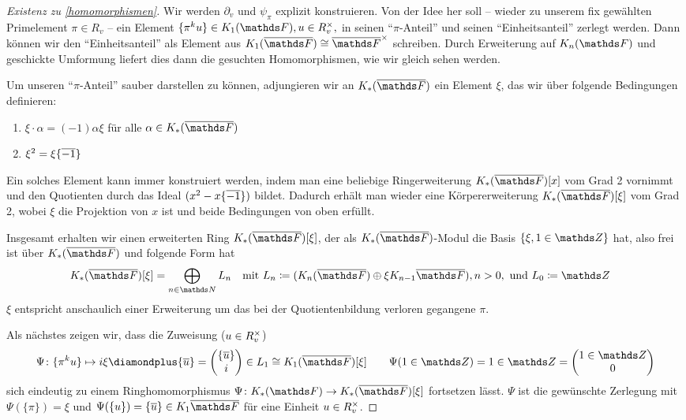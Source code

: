 \documentclass[ngerman,fontsize=11pt, paper=a4, parskip=half, titlepage=true, toc=bib]{scrartcl}
\begin{document}
\begin{proof}[Existenz zu \ref{homomorphismen}]
  Wir werden $\partial_v$ und $\psi_\pi$ explizit konstruieren.
  Von der Idee her soll 
  – wieder zu unserem fix gewählten Primelement $\pi\in R_v$ – 
  ein Element $\{\pi^ku\}\in\KoF, u\in \Rx_v,$
  in seinen \enquote{$\pi$-Anteil} und seinen 
  \enquote{Einheitsanteil} zerlegt werden. 
  Dann können wir den \enquote{Einheitsanteil} als Element aus 
  $\K_1(\bF)\cong \bFx$ schreiben. Durch Erweiterung auf $\KnF$ und 
  geschickte Umformung liefert dies dann die
  gesuchten Homomorphismen, wie wir gleich sehen werden.
  
  Um unseren \enquote{$\pi$-Anteil} sauber darstellen zu können,
  adjungieren wir an $\KbF$ ein Element $\xi$, das wir über
  folgende Bedingungen definieren:
  \begin{enumerate}[(1)]
  \item $\xi\cdot \alpha=(-1)\alpha\xi$ für alle $\alpha\in\KbF$
  \item $\xi^2=\xi\{\overline{-1}\}$
  \end{enumerate}
  Ein solches Element kann immer konstruiert werden, indem man eine
  beliebige Ringerweiterung $\KbF[x]$ vom Grad 2 vornimmt und den
  Quotienten durch das Ideal $(x^2-x\{\overline{-1}\})$ bildet. Dadurch
  erhält man wieder eine Körpererweiterung $\KbF[\xi]$ vom Grad 2,
  wobei $\xi$ die Projektion von $x$ ist und beide Bedingungen von
  oben erfüllt.
  
  Insgesamt erhalten wir einen erweiterten Ring $\KbF[\xi]$, der als
  $\KbF$-Modul die Basis $\{ \xi, 1\in\Z\}$ hat, also frei ist über
  $\KbF$ und folgende Form hat
  \begin{align*}
    \KbF[\xi]&=\bigoplus_{n\in\N}L_n
    &&\text{mit } 
       L_n\coloneqq (\KnbF\oplus\xi\K_{n-1}\bF), n>0,
       \text{ und }L_0\coloneqq\Z
  \end{align*}
  $\xi$ entspricht anschaulich einer Erweiterung um das bei
  der Quotientenbildung verloren gegangene $\pi$.

  Als nächstes zeigen wir, dass die Zuweisung ($u\in R^\times_v$)
  \begin{gather*}
    \Psi\colon\{\pi^ku\}\mapsto i\xi \p \{\ov u\}
    =\begin{pmatrix} \{\ov u\}\\i \end{pmatrix}\in L_1\cong\K_1(\bF)[\xi]
    \qquad \Psi(1\in\Z)=1\in\Z=\begin{pmatrix}1\in\Z\\0\end{pmatrix}
  \end{gather*}
  sich eindeutig zu einem Ringhomomorphismus
  $\Psi\colon\KF\to\KbF[\xi]$ fortsetzen lässt.
  $\Psi$ ist die gewünschte Zerlegung mit $\Psi(\{\pi\})=\xi$ 
  und $\Psi(\{u\})=\{\ov u\}\in\K_1\bF$ für
  eine Einheit $u\in R^\times_v$.


\end{proof}
\end{document}
